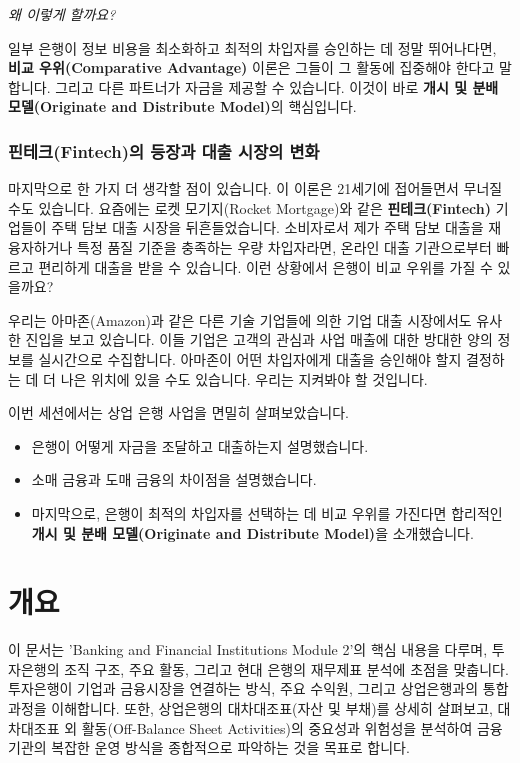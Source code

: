 \documentclass[11pt,a4paper]{book}
\theoremstyle{definition}
\begin{document}
\begin{center}
    \textit{왜 이렇게 할까요?}
\end{center}

일부 은행이 정보 비용을 최소화하고 최적의 차입자를 승인하는 데 정말 뛰어나다면, \textbf{비교 우위(Comparative Advantage)} 이론은 그들이 그 활동에 집중해야 한다고 말합니다. 그리고 다른 파트너가 자금을 제공할 수 있습니다. 이것이 바로 \textbf{개시 및 분배 모델(Originate and Distribute Model)}의 핵심입니다.

\subsubsection*{핀테크(Fintech)의 등장과 대출 시장의 변화}
마지막으로 한 가지 더 생각할 점이 있습니다. 이 이론은 21세기에 접어들면서 무너질 수도 있습니다. 요즘에는 로켓 모기지(Rocket Mortgage)와 같은 \textbf{핀테크(Fintech)} 기업들이 주택 담보 대출 시장을 뒤흔들었습니다. 소비자로서 제가 주택 담보 대출을 재융자하거나 특정 품질 기준을 충족하는 우량 차입자라면, 온라인 대출 기관으로부터 빠르고 편리하게 대출을 받을 수 있습니다. 이런 상황에서 은행이 비교 우위를 가질 수 있을까요?

우리는 아마존(Amazon)과 같은 다른 기술 기업들에 의한 기업 대출 시장에서도 유사한 진입을 보고 있습니다. 이들 기업은 고객의 관심과 사업 매출에 대한 방대한 양의 정보를 실시간으로 수집합니다. 아마존이 어떤 차입자에게 대출을 승인해야 할지 결정하는 데 더 나은 위치에 있을 수도 있습니다. 우리는 지켜봐야 할 것입니다.

\begin{summarybox}[title={Lesson 2-2.3 요약}]
이번 세션에서는 상업 은행 사업을 면밀히 살펴보았습니다.
\begin{itemize}
    \item 은행이 어떻게 자금을 조달하고 대출하는지 설명했습니다.
    \item 소매 금융과 도매 금융의 차이점을 설명했습니다.
    \item 마지막으로, 은행이 최적의 차입자를 선택하는 데 비교 우위를 가진다면 합리적인 \textbf{개시 및 분배 모델(Originate and Distribute Model)}을 소개했습니다.
\end{itemize}
\end{summarybox}


\section{개요}
이 문서는 'Banking and Financial Institutions Module 2'의 핵심 내용을 다루며, 투자은행의 조직 구조, 주요 활동, 그리고 현대 은행의 재무제표 분석에 초점을 맞춥니다. 투자은행이 기업과 금융시장을 연결하는 방식, 주요 수익원, 그리고 상업은행과의 통합 과정을 이해합니다. 또한, 상업은행의 대차대조표(자산 및 부채)를 상세히 살펴보고, 대차대조표 외 활동(Off-Balance Sheet Activities)의 중요성과 위험성을 분석하여 금융기관의 복잡한 운영 방식을 종합적으로 파악하는 것을 목표로 합니다.
\end{document}
